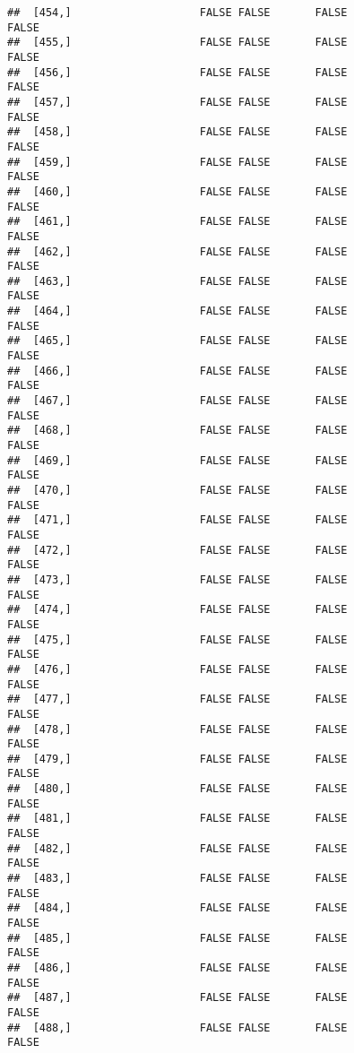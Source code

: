 \documentclass[
]{article}
\begin{document}
\begin{verbatim}
##  [454,]                    FALSE FALSE       FALSE                FALSE
##  [455,]                    FALSE FALSE       FALSE                FALSE
##  [456,]                    FALSE FALSE       FALSE                FALSE
##  [457,]                    FALSE FALSE       FALSE                FALSE
##  [458,]                    FALSE FALSE       FALSE                FALSE
##  [459,]                    FALSE FALSE       FALSE                FALSE
##  [460,]                    FALSE FALSE       FALSE                FALSE
##  [461,]                    FALSE FALSE       FALSE                FALSE
##  [462,]                    FALSE FALSE       FALSE                FALSE
##  [463,]                    FALSE FALSE       FALSE                FALSE
##  [464,]                    FALSE FALSE       FALSE                FALSE
##  [465,]                    FALSE FALSE       FALSE                FALSE
##  [466,]                    FALSE FALSE       FALSE                FALSE
##  [467,]                    FALSE FALSE       FALSE                FALSE
##  [468,]                    FALSE FALSE       FALSE                FALSE
##  [469,]                    FALSE FALSE       FALSE                FALSE
##  [470,]                    FALSE FALSE       FALSE                FALSE
##  [471,]                    FALSE FALSE       FALSE                FALSE
##  [472,]                    FALSE FALSE       FALSE                FALSE
##  [473,]                    FALSE FALSE       FALSE                FALSE
##  [474,]                    FALSE FALSE       FALSE                FALSE
##  [475,]                    FALSE FALSE       FALSE                FALSE
##  [476,]                    FALSE FALSE       FALSE                FALSE
##  [477,]                    FALSE FALSE       FALSE                FALSE
##  [478,]                    FALSE FALSE       FALSE                FALSE
##  [479,]                    FALSE FALSE       FALSE                FALSE
##  [480,]                    FALSE FALSE       FALSE                FALSE
##  [481,]                    FALSE FALSE       FALSE                FALSE
##  [482,]                    FALSE FALSE       FALSE                FALSE
##  [483,]                    FALSE FALSE       FALSE                FALSE
##  [484,]                    FALSE FALSE       FALSE                FALSE
##  [485,]                    FALSE FALSE       FALSE                FALSE
##  [486,]                    FALSE FALSE       FALSE                FALSE
##  [487,]                    FALSE FALSE       FALSE                FALSE
##  [488,]                    FALSE FALSE       FALSE                FALSE

\end{verbatim}
\end{document}
